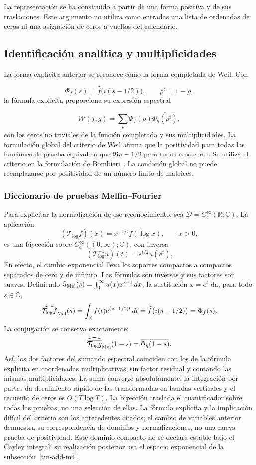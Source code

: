 La representación se ha construido a partir de una forma positiva y de sus traslaciones. Este argumento no utiliza como entradas una lista de ordenadas de ceros ni una asignación de ceros a vueltas del calendario.

\subsection{Identificación analítica y multiplicidades}
\label{rz:identificacion}
La forma explícita anterior se reconoce como la forma completada de Weil. Con

\[
\Phi_f(s)=\widehat f\bigl(i(s-1/2)\bigr),
\qquad \rho^\sharp=1-\overline\rho,
\]
la fórmula explícita proporciona su expresión espectral

\[
\mathscr W(f,g)=\sum_\rho
\Phi_f(\rho)\overline{\Phi_g(\rho^\sharp)},
\]
con los ceros no triviales de la función completada y sus multiplicidades.
La formulación global del criterio de Weil afirma que la positividad para
todas las funciones de prueba equivale a que \(\Re\rho=1/2\) para todos
esos ceros. Se utiliza el criterio en la formulación de
Bombieri~\cite{bombieri2000}. La condición global no puede reemplazarse
por positividad de un número finito de matrices.

\subsubsection*{Diccionario de pruebas Mellin--Fourier}
\label{rz:mellin-fourier}
Para explicitar la normalización de ese reconocimiento, sea
\(\mathcal D=C_c^\infty(\mathbb R;\mathbb C)\). La aplicación
\[
 (\mathcal T_{\log}f)(x)=x^{-1/2}f(\log x),\qquad x>0,
\]
es una biyección sobre \(C_c^\infty((0,\infty);\mathbb C)\), con inversa
\[
 (\mathcal T_{\log}^{-1}u)(t)=e^{t/2}u(e^t).
\]
En efecto, el cambio exponencial lleva los soportes compactos a compactos
separados de cero y de infinito. Las fórmulas son inversas y sus factores
son suaves. Definiendo
\(\widehat u_{\rm Mel}(s)=\int_0^\infty u(x)x^{s-1}\,dx\),
la sustitución \(x=e^t\) da, para todo \(s\in\mathbb C\),
\[
 \widehat{\mathcal T_{\log}f}_{\rm Mel}(s)
 =\int_{\mathbb R}f(t)e^{(s-1/2)t}\,dt
 =\widehat f\bigl(i(s-1/2)\bigr)=\Phi_f(s).
\]
La conjugación se conserva exactamente:
\[
 \widehat{\overline{\mathcal T_{\log}g}}_{\rm Mel}(1-s)
 =\overline{\Phi_g(1-\overline s)}.
\]
Así, los dos factores del sumando espectral coinciden con los de la
fórmula explícita en coordenadas multiplicativas, sin factor residual
y contando las mismas multiplicidades. La suma converge absolutamente:
la integración por partes da decaimiento rápido de las transformadas
en bandas verticales y el recuento de ceros es \(O(T\log T)\).
La biyección traslada el cuantificador sobre todas las pruebas, no una
selección de ellas. La fórmula explícita y la implicación difícil del
criterio son los antecedentes citados; el cambio de variables anterior
demuestra su correspondencia de dominios y normalizaciones, no una nueva
prueba de positividad. Este dominio compacto no se declara estable bajo
el Cayley integral: su realización posterior usa el espacio exponencial
de la subsección~\ref{tm-add-m4}.

